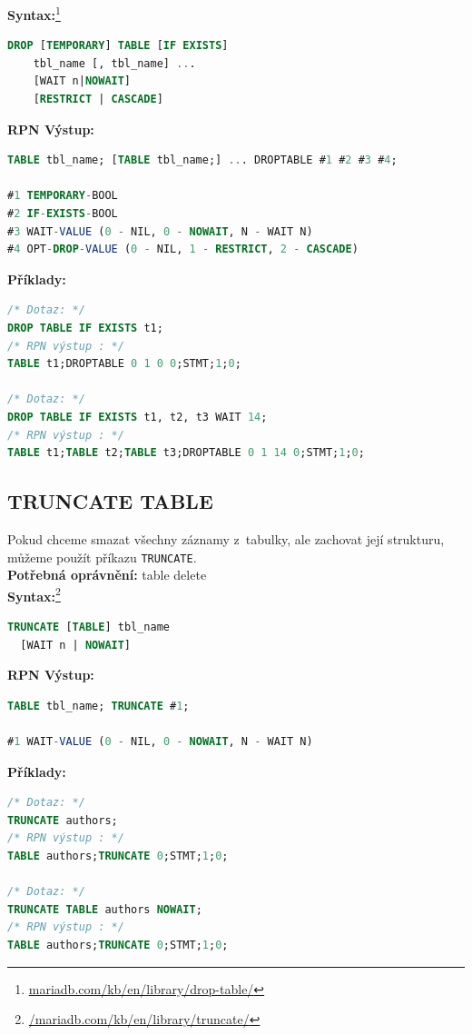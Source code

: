 \textbf{Syntax:}\footnote{\url{mariadb.com/kb/en/library/drop-table/}}
\begin{lstlisting}[language=sql]
DROP [TEMPORARY] TABLE [IF EXISTS]
    tbl_name [, tbl_name] ...
    [WAIT n|NOWAIT]
    [RESTRICT | CASCADE]
\end{lstlisting}
\vspace*{\baselineskip}
\textbf{RPN Výstup:}
\begin{lstlisting}[language=sql]
TABLE tbl_name; [TABLE tbl_name;] ... DROPTABLE #1 #2 #3 #4;

#1 TEMPORARY-BOOL
#2 IF-EXISTS-BOOL
#3 WAIT-VALUE (0 - NIL, 0 - NOWAIT, N - WAIT N)
#4 OPT-DROP-VALUE (0 - NIL, 1 - RESTRICT, 2 - CASCADE)
\end{lstlisting}
\vspace*{\baselineskip}
\textbf{Příklady:}
\begin{lstlisting}[language=sql]
/* Dotaz: */
DROP TABLE IF EXISTS t1;
/* RPN výstup : */
TABLE t1;DROPTABLE 0 1 0 0;STMT;1;0;

/* Dotaz: */
DROP TABLE IF EXISTS t1, t2, t3 WAIT 14;
/* RPN výstup : */
TABLE t1;TABLE t2;TABLE t3;DROPTABLE 0 1 14 0;STMT;1;0;
\end{lstlisting}

\subsection{TRUNCATE TABLE} \label{subsec:6:truncate}
Pokud chceme smazat všechny záznamy z~tabulky, ale zachovat její strukturu, můžeme použít příkazu \texttt{TRUNCATE}. \\

\textbf{Potřebná oprávnění:} table delete \\

\textbf{Syntax:}\footnote{\url{/mariadb.com/kb/en/library/truncate/}}
\begin{lstlisting}[language=sql]
TRUNCATE [TABLE] tbl_name
  [WAIT n | NOWAIT]
\end{lstlisting}
\vspace*{\baselineskip}
\textbf{RPN Výstup:}
\begin{lstlisting}[language=sql]
TABLE tbl_name; TRUNCATE #1;

#1 WAIT-VALUE (0 - NIL, 0 - NOWAIT, N - WAIT N)
\end{lstlisting}
\vspace*{\baselineskip}
\textbf{Příklady:}
\begin{lstlisting}[language=sql]
/* Dotaz: */
TRUNCATE authors;
/* RPN výstup : */
TABLE authors;TRUNCATE 0;STMT;1;0;

/* Dotaz: */
TRUNCATE TABLE authors NOWAIT;
/* RPN výstup : */
TABLE authors;TRUNCATE 0;STMT;1;0;
\end{lstlisting}

